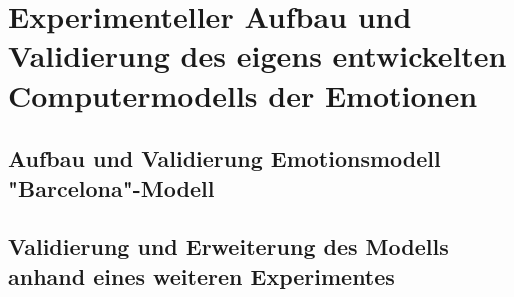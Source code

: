 \chapter{Experimenteller Aufbau und Validierung des eigens entwickelten Computermodells der Emotionen}
 \section{Aufbau und Validierung Emotionsmodell "Barcelona"-Modell}
 \section{Validierung und Erweiterung des Modells anhand eines weiteren Experimentes}